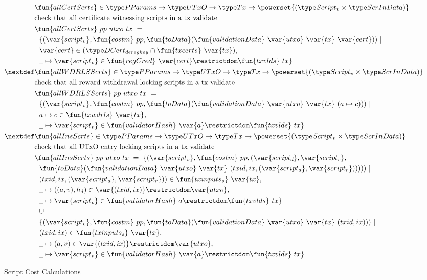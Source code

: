 \begin{figure}[htb]
  \begin{align*}
    & \fun{allCertScrts} \in \PParams \to \UTxO \to \Tx \to \powerset{(\ScriptV \times \ScrInData)} \\
    & \text{check that all certificate witnessing scripts in a tx validate} \\
    & \fun{allCertScrts}~{pp}~{utxo}~{tx}~=~ \\
    & ~~\{ (\var{script_v},\fun{costm}~{pp}, \fun{toData}(\fun{validationData}~\var{utxo}~\var{tx}~\var{cert})) ~\vert \\
    & ~~\var{cert} \in (\DCertDeRegKey\cap\fun{txcerts}~\var{tx}), \\
    &~~\wcard\mapsto \var{script_v}\in \fun{regCred}~\var{cert}\restrictdom\fun{txvlds}~{tx}
     \} \\
    \nextdef
    & \fun{allWDRLSScrts} \in \PParams \to \UTxO \to \Tx \to \powerset{(\ScriptV\times\ScrInData)} \\
    & \text{check that all reward withdrawal locking scripts in a tx validate} \\
    & \fun{allWDRLSScrts}~{pp}~{utxo}~{tx}~=~ \\
    & ~~\{ (\var{script_v},\fun{costm}~{pp},\fun{toData}(\fun{validationData}~\var{utxo}~\var{tx}~
      (a\mapsto c))) ~\vert \\
    & ~~a \mapsto c \in\fun{txwdrls}~\var{tx}, \\
    & ~~\wcard\mapsto \var{script_v}\in \fun{validatorHash}~\var{a}\restrictdom\fun{txvlds}~{tx}\}\\
    \nextdef
    & \fun{allInsScrts} \in \PParams \to \UTxO \to \Tx \to \powerset{(\ScriptV\times\ScrInData)} \\
    & \text{check that all UTxO entry locking scripts in a tx validate} \\
    & \fun{allInsScrts}~{pp}~{utxo}~{tx}~=~ \{ (\var{script_v},\fun{costm}~{pp}, (\var{script_d},\var{script_r}, \\
    & ~~ \fun{toData}(\fun{validationData}~\var{utxo}~\var{tx}~
      (txid,ix,(\var{script_d},\var{script_r}))))) ~\vert \\
    & ~~(txid,ix,(\var{script_d},\var{script_r})) \in
    \fun{txinputs_s}~\var{tx}, \\
    & ~~\wcard \mapsto ((a,v),h_d) \in \var{(txid,ix)}\restrictdom\var{utxo}, \\
    & ~~\wcard\mapsto \var{script_v}\in \fun{validatorHash}~{a}\restrictdom\fun{txvlds}~{tx} \}\\
    & ~~\cup~ \\
    & ~~\{ (\var{script_v},\fun{costm}~{pp},\fun{toData}(\fun{validationData}~\var{utxo}~\var{tx}~
      (txid,ix))) ~\vert \\
    & ~~(txid,ix) \in \fun{txinputs_s}~\var{tx}, \\
    & ~~ \wcard \mapsto (a,v) \in \var{(txid,ix)}\restrictdom\var{utxo}, \\
    & ~~\wcard\mapsto \var{script_v}\in
     \fun{validatorHash}~\var{a}\restrictdom\fun{txvlds}~{tx}\}
  \end{align*}
  \caption{Script Cost Calculations}
  \label{fig:functions:script2}
\end{figure}

